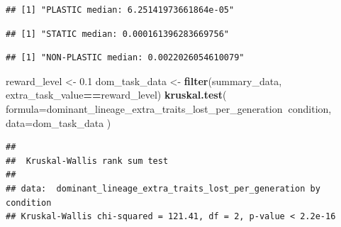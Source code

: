 \documentclass[]{book}
\newenvironment{Shaded}{\begin{snugshade}}{\end{snugshade}}
\newcommand{\DataTypeTok}[1]{\textcolor[rgb]{0.13,0.29,0.53}{#1}}
\newcommand{\FloatTok}[1]{\textcolor[rgb]{0.00,0.00,0.81}{#1}}
\newcommand{\KeywordTok}[1]{\textcolor[rgb]{0.13,0.29,0.53}{\textbf{#1}}}
\newcommand{\NormalTok}[1]{#1}
\newcommand{\OperatorTok}[1]{\textcolor[rgb]{0.81,0.36,0.00}{\textbf{#1}}}
\newcommand{\StringTok}[1]{\textcolor[rgb]{0.31,0.60,0.02}{#1}}
\begin{document}
\begin{verbatim}
## [1] "PLASTIC median: 6.25141973661864e-05"
\end{verbatim}

\begin{Shaded}
\end{Shaded}

\begin{verbatim}
## [1] "STATIC median: 0.000161396283669756"
\end{verbatim}

\begin{Shaded}
\end{Shaded}

\begin{verbatim}
## [1] "NON-PLASTIC median: 0.0022026054610079"
\end{verbatim}

\begin{Shaded}
\begin{Highlighting}[]
\NormalTok{reward_level <-}\StringTok{ }\FloatTok{0.1}
\NormalTok{dom_task_data <-}\StringTok{ }\KeywordTok{filter}\NormalTok{(summary_data, extra_task_value}\OperatorTok{==}\NormalTok{reward_level)}
\KeywordTok{kruskal.test}\NormalTok{(}
  \DataTypeTok{formula=}\NormalTok{dominant_lineage_extra_traits_lost_per_generation}\OperatorTok{~}\NormalTok{condition,}
  \DataTypeTok{data=}\NormalTok{dom_task_data}
\NormalTok{)}
\end{Highlighting}
\end{Shaded}

\begin{verbatim}
## 
##  Kruskal-Wallis rank sum test
## 
## data:  dominant_lineage_extra_traits_lost_per_generation by condition
## Kruskal-Wallis chi-squared = 121.41, df = 2, p-value < 2.2e-16
\end{verbatim}
\end{document}
